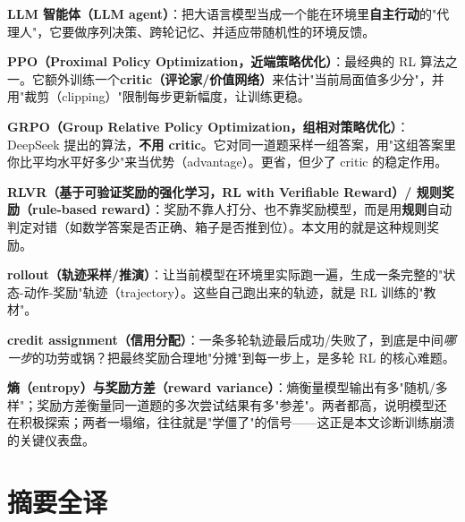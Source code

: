 \documentclass[11pt,UTF8,fontset=fandol]{ctexart}
\begin{document}
\begin{cardbox}
\textbf{LLM 智能体（LLM agent）}：把大语言模型当成一个能在环境里\textbf{自主行动}的"代理人"，它要做序列决策、跨轮记忆、并适应带随机性的环境反馈。
\end{cardbox}

\begin{cardbox}
\textbf{PPO（Proximal Policy Optimization，近端策略优化）}：最经典的 RL 算法之一。它额外训练一个\textbf{critic（评论家/价值网络）}来估计"当前局面值多少分"，并用"裁剪（clipping）"限制每步更新幅度，让训练更稳。
\end{cardbox}

\begin{cardbox}
\textbf{GRPO（Group Relative Policy Optimization，组相对策略优化）}：DeepSeek 提出的算法，\textbf{不用 critic}。它对同一道题采样一组答案，用"这组答案里你比平均水平好多少"来当优势（advantage）。更省，但少了 critic 的稳定作用。
\end{cardbox}

\begin{cardbox}
\textbf{RLVR（基于可验证奖励的强化学习，RL with Verifiable Reward）/ 规则奖励（rule-based reward）}：奖励不靠人打分、也不靠奖励模型，而是用\textbf{规则}自动判定对错（如数学答案是否正确、箱子是否推到位）。本文用的就是这种规则奖励。
\end{cardbox}

\begin{cardbox}
\textbf{rollout（轨迹采样/推演）}：让当前模型在环境里实际跑一遍，生成一条完整的"状态-动作-奖励"轨迹（trajectory）。这些自己跑出来的轨迹，就是 RL 训练的"教材"。
\end{cardbox}

\begin{cardbox}
\textbf{credit assignment（信用分配）}：一条多轮轨迹最后成功/失败了，到底是中间\emph{哪一步}的功劳或锅？把最终奖励合理地"分摊"到每一步上，是多轮 RL 的核心难题。
\end{cardbox}

\begin{cardbox}
\textbf{熵（entropy）与奖励方差（reward variance）}：熵衡量模型输出有多"随机/多样"；奖励方差衡量同一道题的多次尝试结果有多"参差"。两者都高，说明模型还在积极探索；两者一塌缩，往往就是"学僵了"的信号——这正是本文诊断训练崩溃的关键仪表盘。
\end{cardbox}

\section{摘要全译}
\end{document}

